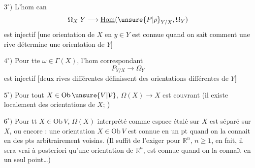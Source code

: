 $3^\circ)$ L'hom can
\[
\Omega_X|Y\longrightarrow\underline{\mathrm{Hom}}(\unsure{P|\rho}_{Y/X},\Omega_Y)
\]
est injectif [une orientation de $X$ en $y\in Y$ est connue quand on sait comment  une rive  détermine une orientation de $Y$]

$4^\circ)$ Pour tte $\omega\in\Gamma(X)$, l'hom correspondant
\[
P_{Y/X}\longrightarrow\Omega_Y
\]
est injectif [deux rives différentes définissent des orientations différentes de $Y$]

$5^\circ)$ Pour tout $X\in\mathrm{Ob}\,\unsure{V|\mathcal{V}}$, $\Omega(X)\to X$ est couvrant (il existe localement des orientations  de $X$; )

$6^\circ)$ Pour tt $X\in\mathrm{Ob}\,V$, $\Omega(X)$ interprété comme espace étalé sur $X$ est séparé sur $X$, ou encore : une orientation  $X\in\mathrm{Ob}\,V$ est connue en un pt quand on la connait en des pts arbitrairement voisins. (Il suffit de l'exiger pour $\mathbb{R}^n$, $n\geq 1$, en fait, il sera vrai à posteriori qu'une orientation de $\mathbb{R}^n$,  est connue quand on la connaît en un seul point\ldots)
